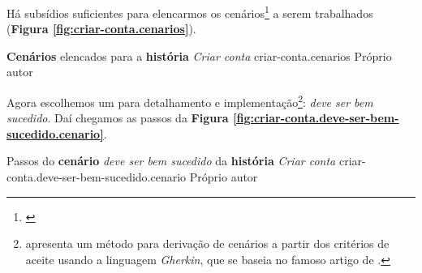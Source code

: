     Há subsídios suficientes para elencarmos os cenários\footnote{\cite{Adzic2011}} a serem trabalhados (\textbf{Figura \ref{fig:criar-conta.cenarios}}).

    \figura
      {\textbf{Cenários} elencados para a \textbf{história} \emph{Criar conta}}
      {criar-conta.cenarios}
      {Próprio autor}

    Agora escolhemos um para detalhamento e implementação\footnote{ apresenta um método para derivação de cenários a partir dos critérios de aceite usando a linguagem \emph{Gherkin}, que se baseia no famoso artigo de .}: \emph{deve ser bem sucedido}. Daí chegamos as passos da \textbf{Figura \ref{fig:criar-conta.deve-ser-bem-sucedido.cenario}}.

    \figura
      {
        Passos do \textbf{cenário} \emph{deve ser bem sucedido} da
        \textbf{história} \emph{Criar conta}
      }
      {criar-conta.deve-ser-bem-sucedido.cenario}
      {Próprio autor}



